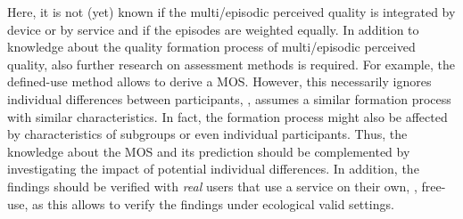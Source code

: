 Here, it is not (yet) known if the multi\-/episodic perceived quality is integrated by device or by service and if the episodes are weighted equally.
In addition to knowledge about the quality formation process of multi\-/episodic perceived quality, also further research on assessment methods is required.
For example, the defined-use method allows to derive a \ac{MOS}.
However, this necessarily ignores individual differences between participants, \ie, assumes a similar formation process with similar characteristics.
In fact, the formation process might also be affected by characteristics of subgroups or even individual participants.
Thus, the knowledge about the \ac{MOS} and its prediction should be complemented by investigating the impact of potential individual differences.
In addition, the findings should be verified with \emph{real} users that use a service on their own, \ie, free-use, as this allows to verify the findings under ecological valid settings.